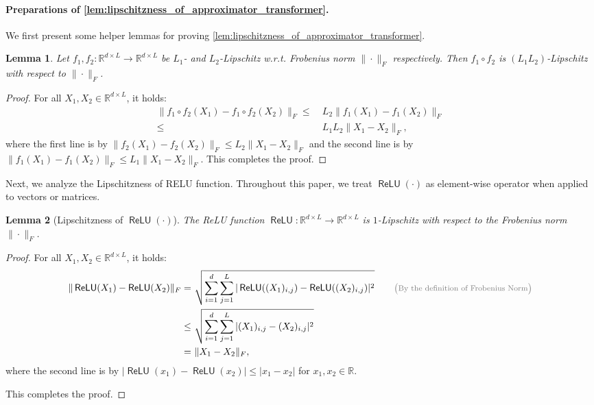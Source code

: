 \documentclass[12pt]{article}
\numberwithin{equation}{section}
\newcommand{\ReLU}{\mathop{\mathsf{ReLU}}}
\def\R{\mathbb{R}}
\theoremstyle{theoremstyle}
\newtheorem{lemma}{Lemma}[section]
\numberwithin{equation}{section}
\numberwithin{theorem}{section}
\numberwithin{proposition}{section}
\numberwithin{definition}{section}
\numberwithin{lemma}{section}
\numberwithin{assumption}{section}
\numberwithin{remark}{section}
\newcommand*{\annot}[1]{\tag*{\footnotesize{\textcolor{black!50}{\big(#1\big)}}}}
\begin{document}
\paragraph{Preparations of \cref{lem:lipschitzness_of_approximator_transformer}.}
We first present some helper lemmas for proving \cref{lem:lipschitzness_of_approximator_transformer}.

\begin{lemma}\label{lem:lipschitzness_of_composition}
    Let $f_1,f_2:\R^{d\times L}\to \R^{d\times L}$ be $L_1$- and $L_2$-Lipschitz w.r.t. Frobenius norm $\|\cdot\|_F$ respectively.
    Then $f_1\circ f_2$ is $(L_1L_2)$-Lipschitz with respect to $\|\cdot\|_F$.
\end{lemma}

\begin{proof}
For all $X_1,X_2\in\R^{d\times L}$, it holds:
\begin{align*}
    \|f_1\circ f_2(X_1)-f_1\circ f_2(X_2)\|_F \leq & ~
    L_2\|f_1(X_1)-f_1(X_2)\|_F \\
    \leq & ~
    L_1 L_2\|X_1-X_2\|_F,
\end{align*}
where the first line is by $\|f_2(X_1)-f_2(X_2)\|_F\leq L_2\|X_1-X_2\|_F$ and the second line is by $\|f_1(X_1)-f_1(X_2)\|_F\leq L_1\|X_1-X_2\|_F$.
This completes the proof.
\end{proof}

Next, we analyze the Lipschitzness of RELU function.
Throughout this paper, we treat $\ReLU(\cdot)$ as element-wise operator when applied to vectors or matrices.

\begin{lemma}[Lipschitzness of $\ReLU(\cdot)$]\label{lem:lipschitzness_of_relu}
    The ReLU function $\ReLU:\R^{d\times L}\to \R^{d\times L}$ is $1$-Lipschitz with respect to the Frobenius norm  $\|\cdot\|_F$.
\end{lemma}

\begin{proof}
For all $X_1,X_2\in\R^{d\times L}$, it holds:
\begin{align*}
    \|\ReLU(X_1)-\ReLU(X_2)\|_F 
    = & ~
    \sqrt{\sum_{i=1}^d\sum_{j=1}^L|\ReLU((X_1)_{i,j})-\ReLU((X_2)_{i,j})|^2} \annot{By the definition of Frobenius Norm}\\
    \leq & ~
    \sqrt{\sum_{i=1}^d\sum_{j=1}^L|(X_1)_{i,j}-(X_2)_{i,j}|^2 }
    \\
    = & ~
    \|X_1-X_2\|_F,
\end{align*}
where the second line is by $|\ReLU(x_1)-\ReLU(x_2)|\leq|x_1-x_2|$ for $x_1,x_2\in\R$.

This completes the proof.
\end{proof}
\end{document}
